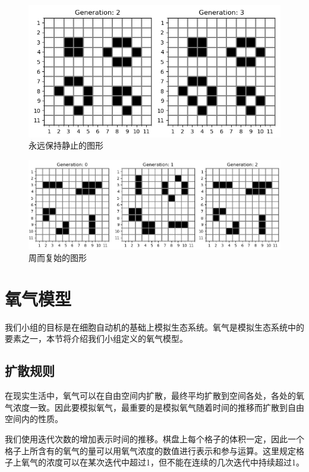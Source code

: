 \documentclass{ctexart}
\begin{document}
\begin{figure}[ht]
  \centering
  \includegraphics[scale=0.75]{classic-fixed.png}
  \caption{永远保持静止的图形}
  \label{fig:classic-fixed}
\end{figure}

\begin{figure}[ht]
  \centering
  \includegraphics[width=\textwidth]{classic-vibrating.png}
  \caption{周而复始的图形}
  \label{fig:classic-vibrating}
\end{figure}

\section{氧气模型}

我们小组的目标是在细胞自动机的基础上模拟生态系统。氧气是模拟生态系统中的要素之一，本节将介绍我们小组定义的氧气模型。

\subsection{扩散规则}

在现实生活中，氧气可以在自由空间内扩散，最终平均扩散到空间各处，各处的氧气浓度一致。因此要模拟氧气，最重要的是模拟氧气随着时间的推移而扩散到自由空间内的性质。

我们使用迭代次数的增加表示时间的推移。棋盘上每个格子的体积一定，因此一个格子上所含有的氧气的量可以用氧气浓度的数值进行表示和参与运算。这里规定格子上氧气的浓度可以在某次迭代中超过1，但不能在连续的几次迭代中持续超过1。
\end{document}
